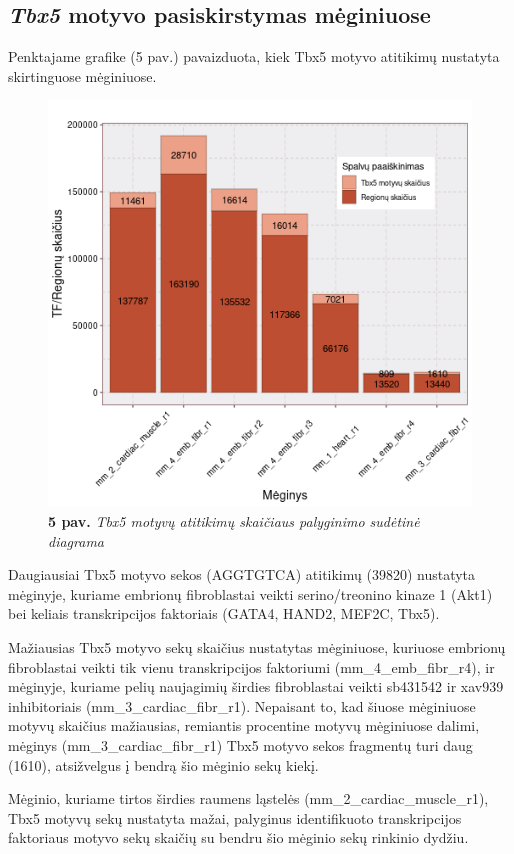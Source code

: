 \documentclass[12pt]{article}
\begin{document}
\subsection{\emph{Tbx5} motyvo pasiskirstymas mėginiuose}
Penktajame grafike (5 pav.) pavaizduota, kiek Tbx5 motyvo
atitikimų nustatyta skirtinguose mėginiuose.

\begin{figure}[htb]
    \begin{center}
        \includegraphics[width=0.6\linewidth]{../Figures/tf_hit_percentage.png}
        \caption*{\textbf{5 pav.} \emph{Tbx5 motyvų atitikimų skaičiaus palyginimo
                  sudėtinė diagrama}}
    \end{center}
\end{figure}

Daugiausiai Tbx5 motyvo sekos (AGGTGTCA) atitikimų (39820)
nustatyta mėginyje, kuriame embrionų fibroblastai veikti
serino/treonino kinaze 1 (Akt1) bei keliais transkripcijos
faktoriais (GATA4, HAND2, MEF2C, Tbx5).

Mažiausias Tbx5 motyvo sekų skaičius nustatytas mėginiuose,
kuriuose embrionų fibroblastai veikti tik vienu transkripcijos
faktoriumi (mm\_4\_emb\_fibr\_r4), ir mėginyje, kuriame
pelių naujagimių širdies fibroblastai veikti sb431542 ir
xav939 inhibitoriais (mm\_3\_cardiac\_fibr\_r1).
Nepaisant to, kad šiuose mėginiuose motyvų skaičius mažiausias,
remiantis procentine motyvų mėginiuose dalimi, mėginys
(mm\_3\_cardiac\_fibr\_r1) Tbx5 motyvo sekos fragmentų turi
daug (1610), atsižvelgus į bendrą šio mėginio sekų kiekį.

Mėginio, kuriame tirtos širdies raumens ląstelės
(mm\_2\_cardiac\_muscle\_r1), Tbx5 motyvų sekų nustatyta
mažai, palyginus identifikuoto transkripcijos faktoriaus
motyvo sekų skaičių su bendru šio mėginio sekų rinkinio
dydžiu.
\end{document}
